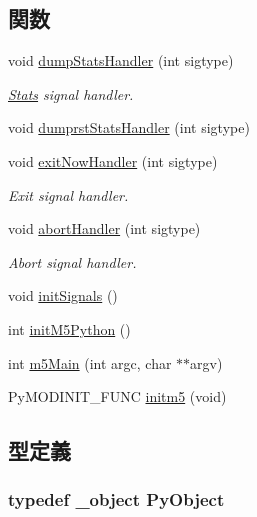\subsection*{関数}
\begin{DoxyCompactItemize}
\item 
void \hyperlink{init_8hh_a022a6cffd1e62434c8d2db231132ebc5}{dumpStatsHandler} (int sigtype)
\begin{DoxyCompactList}\small\item\em \hyperlink{namespaceStats}{Stats} signal handler. \item\end{DoxyCompactList}\item 
void \hyperlink{init_8hh_aa15513491cd8b43dacf2680124c1feec}{dumprstStatsHandler} (int sigtype)
\item 
void \hyperlink{init_8hh_a82498a29f5c97cedefc027aef34c198a}{exitNowHandler} (int sigtype)
\begin{DoxyCompactList}\small\item\em Exit signal handler. \item\end{DoxyCompactList}\item 
void \hyperlink{init_8hh_a285bd5faf9d027a414cc6c68c1af574c}{abortHandler} (int sigtype)
\begin{DoxyCompactList}\small\item\em Abort signal handler. \item\end{DoxyCompactList}\item 
void \hyperlink{init_8hh_a8e6d6582b28c82a93332d8f8fc331c71}{initSignals} ()
\item 
int \hyperlink{init_8hh_a3b22eeb5fc94acc80cbbf4d9baa19ea2}{initM5Python} ()
\item 
int \hyperlink{init_8hh_a2c29b07c70d79dfd1b822d2b0cdd50c0}{m5Main} (int argc, char $\ast$$\ast$argv)
\item 
PyMODINIT\_\-FUNC \hyperlink{init_8hh_a0315a0cf1d812b58eb30d8c40e4f83f7}{initm5} (void)
\end{DoxyCompactItemize}


\subsection{型定義}
\hypertarget{init_8hh_ae19630c1f4ca6d5236b30719d9140013}{
\subsubsection[{PyObject}]{\setlength{\rightskip}{0pt plus 5cm}typedef \_\-object {\bf PyObject}}}
\label{init_8hh_ae19630c1f4ca6d5236b30719d9140013}


